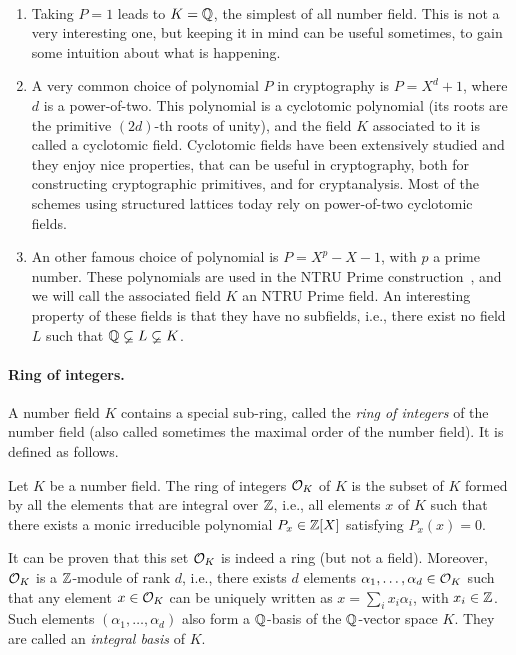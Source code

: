 \begin{example}\ 
\begin{enumerate}
\item Taking $P = 1$ leads to $K = \mathbb{Q}$, the simplest of all number field. This is not a very interesting one, but keeping it in mind can be useful sometimes, to gain some intuition about what is happening.
\item A very common choice of polynomial $P$ in cryptography is $P = X^d+1$, where $d$ is a power-of-two. This polynomial is a cyclotomic polynomial (its roots are the primitive $(2d)$-th roots of unity), and the field $K$ associated to it is called a cyclotomic field. Cyclotomic fields have been extensively studied and they enjoy nice properties, that can be useful in cryptography, both for constructing cryptographic primitives, and for cryptanalysis. Most of the schemes using structured lattices today rely on power-of-two cyclotomic fields.
\item An other famous choice of polynomial is $P = X^p-X-1$, with $p$ a prime number. These polynomials are used in the NTRU Prime construction~\cite{NTRUPrime}, and we will call the associated field $K$ an NTRU Prime field. An interesting property of these fields is that they have no subfields, i.e., there exist no field $L$ such that $\mathbb{Q} \varsubsetneq L \varsubsetneq K$.
\end{enumerate}
\end{example}

\paragraph{Ring of integers.} A number field $K$ contains a special sub-ring, called the \emph{ring of integers} of the number field (also called sometimes the maximal order of the number field). It is defined as follows.

\begin{definition}
\label{def:ring-of-integers}
Let $K$ be a number field. The ring of integers $\mathcal{O}_K$ of $K$ is the subset of $K$ formed by all the elements that are integral over $\mathbb{Z}$, i.e., all elements $x$ of $K$ such that there exists a monic irreducible polynomial $P_x \in \mathbb{Z}[X]$ satisfying $P_x(x) = 0$.
\end{definition}

It can be proven that this set $\mathcal{O}_K$ is indeed a ring (but not a field). Moreover, $\mathcal{O}_K$ is a $\mathbb{Z}$-module of rank $d$, i.e., there exists $d$ elements $\alpha_1, \dots, \alpha_d \in \mathcal{O}_K$ such that any element $x \in \mathcal{O}_K$ can be uniquely written as $x = \sum_i x_i \alpha_i$, with $x_i \in \mathbb{Z}$. Such elements $(\alpha_1, \dots, \alpha_d)$ also form a $\mathbb{Q}$-basis of the $\mathbb{Q}$-vector space $K$. They are called an \emph{integral basis} of $K$.

